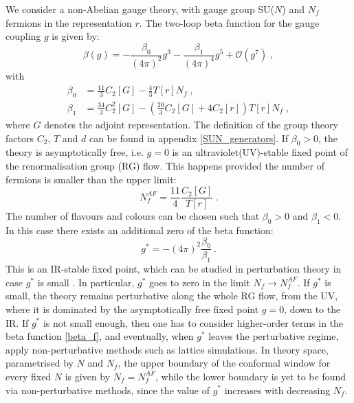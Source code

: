 We consider a non-Abelian gauge theory, with gauge group SU($N$) and $N_f$ fermions in the representation $r$. The two-loop beta function for the gauge coupling $g$ is given by:
 \begin{equation}
 \beta (g) = - \frac{\beta_0}{(4\pi)^2} g^3 - \frac{\beta_1}{(4\pi)^4} g^5 + \mathcal{O}(g^{7}) \; ,
 \label{beta_f}
 \end{equation}
%
with
 \begin{align}
\beta_0 &= \frac{11}{3} C_2[G] - \frac{4}{3} T[r] N_f\; , \\
\beta_1 &= \frac{34}{3} C_2^2[G] - \left ( \frac{20}{3} C_2[G] + 4 C_2[r] \right ) T[r] N_f\; ,
\end{align}
%
where $G$ denotes the adjoint representation. The definition of the group theory factors $C_2$, $T$ and $d$ can be found in appendix \ref{SUN_generators}. If $\beta_0 > 0$, the theory is asymptotically free, i.e. $g=0$ is an ultraviolet(UV)-stable fixed point of the renormalisation group (RG) flow. This happens provided the number of fermions is smaller than the upper limit:
\begin{equation}
N_f^{AF} = \frac{11}{4} \frac{C_2[G]}{T[r]} \: .
\label{NfAF}
\end{equation}
%
The number of flavours and colours can be chosen such that $\beta_0>0$ and $\beta_1<0$. In this case there exists an additional zero of the beta function:
\begin{equation}
g^* = -(4 \pi)^2 \frac{\beta_0}{\beta_1} \: .
\label{BanksZaks}
\end{equation}
%
This is an IR-stable fixed point, which can be studied in perturbation theory in case $g^*$ is small \cite{Banks:1981nn}. In particular, $g^*$ goes to zero in the limit $N_f \to N_f^{AF}$. If $g^*$ is small, the theory remains perturbative along the whole RG flow, from the UV, where it is dominated by the asymptotically free fixed point $g=0$, down to the IR. If $g^*$ is not small enough, then one has to consider higher-order terms in the beta function \ref{beta_f}, and eventually, when $g^*$ leaves the perturbative regime, apply non-perturbative methods such as lattice simulations. In theory space, parametrised by $N$ and $N_f$, the upper boundary of the conformal window for every fixed $N$ is given by $N_f = N_f^{AF}$, while the lower boundary is yet to be found via non-perturbative methods, since the value of $g^*$ increases with decreasing $N_f$.


